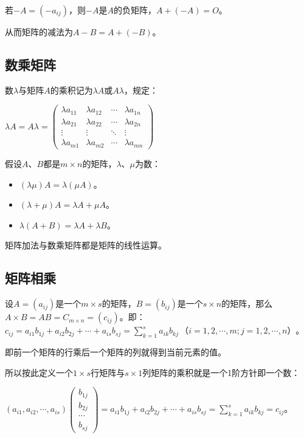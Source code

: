 \documentclass[UTF8, 12pt]{ctexart}
\begin{document}
若$-A=(-a_{ij})$，则$-A$是$A$的负矩阵，$A+(-A)=O$。

从而矩阵的减法为$A-B=A+(-B)$。

\subsection{数乘矩阵}

数$\lambda$与矩阵$A$的乘积记为$\lambda A$或$A\lambda$，规定：\medskip

$\lambda A=A\lambda=\left(
\begin{array}{cccc}
\lambda a_{11} & \lambda a_{12} & \cdots & \lambda a_{1n} \\
\lambda a_{21} & \lambda a_{22} & \cdots & \lambda a_{2n} \\
\vdots & \vdots & \ddots & \vdots \\
\lambda a_{m1} & \lambda a_{m2} & \cdots & \lambda a_{mn}
\end{array}
\right)$ \medskip

假设$A$、$B$都是$m\times n$的矩阵，$\lambda$、$\mu$为数：

\begin{itemize}
\item $(\lambda\mu)A=\lambda(\mu A)$。
\item $(\lambda+\mu)A=\lambda A+\mu A$。
\item $\lambda(A+B)=\lambda A+\lambda B$。
\end{itemize}

矩阵加法与数乘矩阵都是矩阵的线性运算。

\subsection{矩阵相乘}

设$A=(a_{ij})$是一个$m\times s$的矩阵，$B=(b_{ij})$是一个$s\times n$的矩阵，那么$A\times B=AB=C_{m\times n}=(c_{ij})$。即：$c_{ij}=a_{i1}b_{1j}+a_{i2}b_{2j}+\cdots+a_{is}b_{sj}=\sum\limits_{k=1}^sa_{ik}b_{kj}\,\text{（}i=1,2,\cdots,m;j=1,2,\cdots,n\text{）}$。

即前一个矩阵的行乘后一个矩阵的列就得到当前元素的值。

所以按此定义一个$1\times s$行矩阵与$s\times 1$列矩阵的乘积就是一个1阶方针即一个数：

$(a_{i1},a_{i2},\cdots,a_{is})\left(
\begin{array}{c}
b_{1j} \\
b_{2j} \\
\cdots \\
b_{sj}
\end{array}
\right)=a_{i1}b_{1j}+a_{i2}b_{2j}+\cdots+a_{is}b_{sj}=\sum\limits_{k=1}^sa_{ik}b_{kj}=c_{ij}$。\medskip
\end{document}
